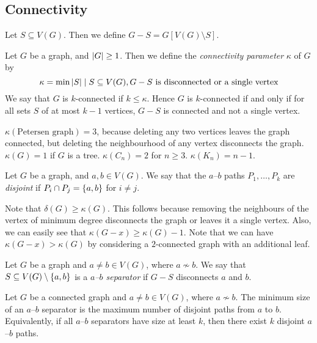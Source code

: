 \subsection{Connectivity}
Let \( S \subseteq V(G) \).
Then we define \( G - S = G[V(G) \setminus S] \).
\begin{definition}
	Let \( G \) be a graph, and \( \abs{G} \geq 1 \).
	Then we define the \emph{connectivity parameter} \( \kappa \) of \( G \) by
	\[ \kappa = \min{\abs{S} \mid S \subseteq V(G), G - S \text{ is disconnected or a single vertex}} \]
	We say that \( G \) is \( k \)-connected if \( k \leq \kappa \).
	Hence \( G \) is \( k \)-connected if and only if for all sets \( S \) of at most \( k-1 \) vertices, \( G - S \) is connected and not a single vertex.
\end{definition}
\begin{example}
	\( \kappa(\text{Petersen graph}) = 3 \), because deleting any two vertices leaves the graph connected, but deleting the neighbourhood of any vertex disconnects the graph.
	\( \kappa(G) = 1 \) if \( G \) is a tree.
	\( \kappa(C_n) = 2 \) for \( n \geq 3 \).
	\( \kappa(K_n) = n - 1 \).
\end{example}
\begin{definition}
	Let \( G \) be a graph, and \( a, b \in V(G) \).
	We say that the \( a \)--\( b \) paths \( P_1, \dots, P_k \) are \emph{disjoint} if \( P_i \cap P_j = \qty{a, b} \) for \( i \neq j \).
\end{definition}
Note that \( \delta(G) \geq \kappa(G) \).
This follows because removing the neighbours of the vertex of minimum degree disconnects the graph or leaves it a single vertex.
Also, we can easily see that \( \kappa(G - x) \geq \kappa(G) - 1 \).
Note that we can have \( \kappa(G-x) > \kappa(G) \) by considering a \( 2 \)-connected graph with an additional leaf.
\begin{definition}
	Let \( G \) be a graph and \( a \neq b \in V(G) \), where \( a \not\sim b \).
	We say that \( S \subseteq V(G) \setminus \qty{a,b} \) is a \emph{\( a \)--\( b \) separator} if \( G - S \) disconnects \( a \) and \( b \).
\end{definition}
\begin{theorem}
	Let \( G \) be a connected graph and \( a \neq b \in V(G) \), where \( a \not\sim b \).
	The minimum size of an \( a \)--\( b \) separator is the maximum number of disjoint paths from \( a \) to \( b \).
	Equivalently, if all \( a \)--\( b \) separators have size at least \( k \), then there exist \( k \) disjoint \( a \)--\( b \) paths.
\end{theorem}
